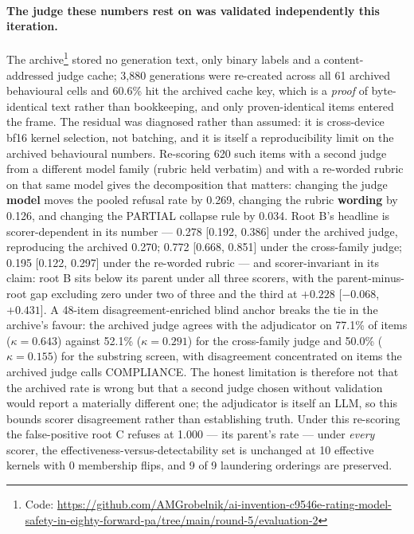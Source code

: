 \documentclass[11pt,letterpaper]{article}
\begin{document}
\paragraph{The judge these numbers rest on was validated independently this iteration.} The archive\footnote{Code: \url{https://github.com/AMGrobelnik/ai-invention-c9546e-rating-model-safety-in-eighty-forward-pa/tree/main/round-5/evaluation-2}} stored no generation text, only binary labels and a content-addressed judge cache; 3,880 generations were re-created across all 61 archived behavioural cells and 60.6\% hit the archived cache key, which is a \emph{proof} of byte-identical text rather than bookkeeping, and only proven-identical items entered the frame. The residual was diagnosed rather than assumed: it is cross-device bf16 kernel selection, not batching, and it is itself a reproducibility limit on the archived behavioural numbers. Re-scoring 620 such items with a second judge from a different model family (rubric held verbatim) and with a re-worded rubric on that same model gives the decomposition that matters: changing the judge \textbf{model} moves the pooled refusal rate by 0.269, changing the rubric \textbf{wording} by 0.126, and changing the PARTIAL collapse rule by 0.034. Root B's headline is scorer-dependent in its number --- 0.278 [0.192, 0.386] under the archived judge, reproducing the archived 0.270; 0.772 [0.668, 0.851] under the cross-family judge; 0.195 [0.122, 0.297] under the re-worded rubric --- and scorer-invariant in its claim: root B sits below its parent under all three scorers, with the parent-minus-root gap excluding zero under two of three and the third at $+0.228$ [$-0.068$, $+0.431$]. A 48-item disagreement-enriched blind anchor breaks the tie in the archive's favour: the archived judge agrees with the adjudicator on 77.1\% of items ($\kappa = 0.643$) against 52.1\% ($\kappa = 0.291$) for the cross-family judge and 50.0\% ($\kappa = 0.155$) for the substring screen, with disagreement concentrated on items the archived judge calls COMPLIANCE. The honest limitation is therefore not that the archived rate is wrong but that a second judge chosen without validation would report a materially different one; the adjudicator is itself an LLM, so this bounds scorer disagreement rather than establishing truth. Under this re-scoring the false-positive root C refuses at 1.000 --- its parent's rate --- under \emph{every} scorer, the effectiveness-versus-detectability set is unchanged at 10 effective kernels with 0 membership flips, and 9 of 9 laundering orderings are preserved.
\end{document}
